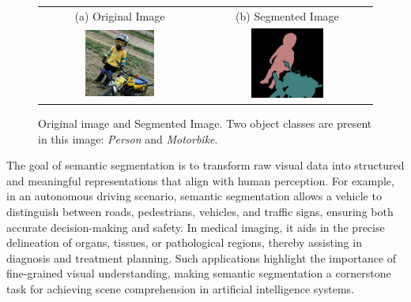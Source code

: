 \begin{figure}[htbp]
    \centering
    \setlength{\tabcolsep}{2pt} %
    \renewcommand{\arraystretch}{0.9}
        \begin{minipage}{0.7\textwidth}
            \centering
            \begin{tabular}{c c} %

            (a) Original Image & (b) Segmented Image \\
            [1mm]
            \includegraphics[width=0.45\textwidth,height=0.45\textwidth]{figures/originals/2007_000733.jpg}
            & 
            \includegraphics[width=0.45\textwidth,height=0.45\textwidth]{figures/colored_gts/2007_000733.png}
            \\
            \end{tabular}
        \end{minipage}
    \caption{Original image and Segmented Image. Two object classes are present in this image: \textit{Person} and \textit{Motorbike}.}
    \label{fig:semantic_segmentation_example}
\end{figure}

The goal of semantic segmentation is to transform raw visual data into structured and meaningful representations that align with human perception. For example, in an autonomous driving scenario, semantic segmentation allows a vehicle to distinguish between roads, pedestrians, vehicles, and traffic signs, ensuring both accurate decision-making and safety. In medical imaging, it aids in the precise delineation of organs, tissues, or pathological regions, thereby assisting in diagnosis and treatment planning. Such applications highlight the importance of fine-grained visual understanding, making semantic segmentation a cornerstone task for achieving scene comprehension in artificial intelligence systems.

